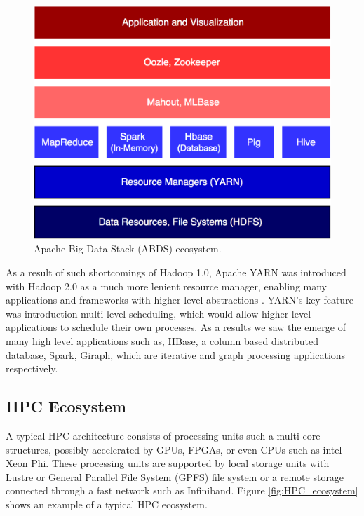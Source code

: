 \documentclass[runningheads,a4paper]{llncs}
\begin{document}
\begin{figure}
	\includegraphics[scale=0.23]{./images/abds_ecosystem.png}
	\centering
	\caption{Apache Big Data Stack (ABDS) ecosystem.}
	\label{fig:ABDS_ecosystem}
\end{figure}

As a result of such shortcomings of Hadoop 1.0, Apache YARN was introduced with Hadoop 2.0 as a much more lenient resource manager, enabling many applications and frameworks with higher level abstractions \cite{vavilapalli2013apache}. YARN's key feature was introduction multi-level scheduling, which would allow higher level applications to schedule their own processes. As a results we saw the emerge of many high level applications such as, HBase, a column based distributed database, Spark, Giraph, which are iterative and graph processing applications respectively\cite{borthakur2011apache}\cite{zaharia2012resilient}.

\subsection{HPC Ecosystem}

A typical HPC architecture consists of processing units such a multi-core structures, possibly accelerated by GPUs, FPGAs, or even CPUs such as intel Xeon Phi. These processing units are supported by local storage units with Lustre \cite{braam2004lustre} or General Parallel File System (GPFS) \cite{FrankSchmuck} file system or a remote storage connected through a fast network such as Infiniband. Figure \ref{fig:HPC_ecosystem} shows an example of a typical HPC ecosystem.\\
\end{document}
